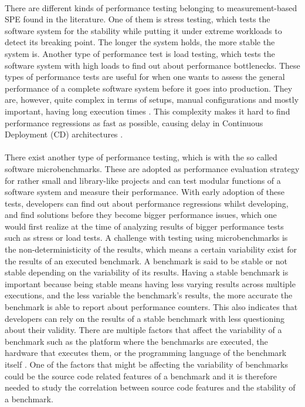 \documentclass{seal_thesis}
\begin{document}
\\
There are different kinds of performance testing belonging to measurement-based SPE found in the literature. One of them is stress testing, which tests the software system for the stability while putting it under extreme workloads to detect its breaking point. The longer the system holds, the more stable the system is. Another type of performance test is load testing, which tests the software system with high loads to find out about performance bottlenecks. These types of performance tests are useful for when one wants to assess the general performance of a complete software system before it goes into production. They are, however, quite complex in terms of setups, manual configurations and mostly important, having long execution times \cite{Nguyen:2014:ICS:2597073.2597092}. This complexity makes it hard to find performance regressions as fast as possible, causing delay in Continuous Deployment (CD) architectures \cite{Laaber:2018:EOS:3196398.3196407}.\\
\\
There exist another type of performance testing, which is with the so called software microbenchmarks. These are adopted as performance evaluation strategy for rather small and library-like projects\cite{laaber2019software} and can test modular functions of a software system and measure their performance\cite{costa2019}. With early adoption of these tests, developers can find out about performance regressions whilst developing, and find solutions before they become bigger performance issues, which one would first realize at the time of analyzing results of bigger performance tests such as stress or load tests. A challenge with testing using microbenchmarks is the non-deterministicity of the results, which means a certain variability exist for the results of an executed benchmark\cite{Laaber:2018:EOS:3196398.3196407}. A benchmark is said to be stable or not stable depending on the variability of its results. Having a stable benchmark is important because being stable means having less varying results across multiple executions, and the less variable the benchmark's results, the more accurate the benchmark is able to report about performance counters. This also indicates that developers can rely on the results of a stable benchmark with less questioning about their validity. There are multiple factors that affect the variability of a benchmark such as the platform where the benchmarks are executed, the hardware that executes them, or the programming language of the benchmark itself \cite{laaber2018performance}. One of the factors that might be affecting the variability of benchmarks could be the source code related features of a benchmark and it is therefore needed to study the correlation between source code features and the stability of a benchmark.\\
\end{document}

